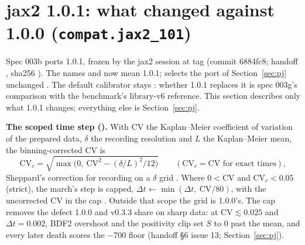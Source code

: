 \section{jax2 1.0.1: what changed against 1.0.0 (\texttt{compat.jax2\_101})}\label{sec:j101}

\tplPurpose
Spec 003b ports  1.0.1, frozen by the jax2 session at tag  (commit
6884fc8; handoff , sha256 ). The names  and
 now mean 1.0.1;  selects the port of Section~\ref{sec:pj} unchanged
. The default calibrator stays : whether 1.0.1 replaces it is spec 003g's
comparison with the benchmark's library-v6 reference. This section describes only what 1.0.1 changes; everything else is
Section~\ref{sec:pj}.

\tplMath
\textbf{The scoped time step ().} With $\mathrm{CV}$ the Kaplan--Meier coefficient of variation of the
prepared data, $\delta$ the recording resolution and $L$ the Kaplan--Meier mean, the binning-corrected CV is
\begin{equation}
  \mathrm{CV}_c=\sqrt{\max\!\bigl(0,\ \mathrm{CV}^2-(\delta/L)^2/12\bigr)}\qquad(\mathrm{CV}_c=\mathrm{CV}\text{ for exact times}),
\end{equation}
Sheppard's correction for recording on a $\delta$ grid . Where
$0<\mathrm{CV}$ and $\mathrm{CV}_c<0.05$ (strict), the march's step is capped,
$\Delta t\leftarrow\min(\Delta t,\ \mathrm{CV}/80)$, with the uncorrected CV in the cap
. Outside that scope the grid is 1.0.0's. The cap removes the defect 1.0.0 and
v0.3.3 share on sharp data: at $\mathrm{CV}\lesssim0.025$ and $\Delta t=0.002$, BDF2 overshoot and the positivity clip set
$S$ to 0 past the mean, and every later death scores the $-700$ floor (handoff \S6 issue 13; Section~\ref{sec:pj}).

